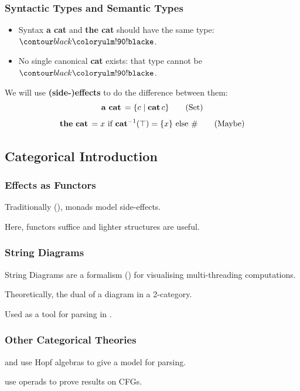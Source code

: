 \documentclass[math, english, info]{beamercours}
\begin{document}
\begin{frame}[fragile]
	\frametitle{Syntactic Types and Semantic Types}
	\begin{itemize}
		\item Syntax \textbf{a cat} and \textbf{the cat} should have the same type: $\e$.
		      \pause
		\item No single canonical \textbf{cat} exists: that type cannot be $\e$.
	\end{itemize}
	\pause

	We will use \textbf{(side-)effects} to do the difference between them:
	\begin{equation*}
		\mathbf{a\ cat}\, = \{c \mid \mathbf{cat}\, c\} \tag{Set}
	\end{equation*}
	\begin{equation*}
		\mathbf{the\ cat}\, = x \text{ if } \mathbf{cat}^{-1}(\top) = \{x\} \text{ else } \# \tag{Maybe}
	\end{equation*}
\end{frame}

\subsection{Categorical Introduction}
\begin{frame}
	\frametitle{Effects as Functors}
	Traditionally (\cite{moggiComputationalLambdacalculusMonads1989}), monads model side-effects.
	\pause

	Here, functors suffice and lighter structures are useful.
\end{frame}

\begin{frame}
	\frametitle{String Diagrams}
	String Diagrams are a formalism (\cite{hinzeIntroducingStringDiagrams2023})
	for visualising multi-threading computations.

	\medskip

	Theoretically, the dual of a diagram in a 2-category.

	\pause
	\medskip
	Used as a tool for parsing in \cite{coeckeMathematicalFoundationsCompositional2010}.
\end{frame}

\begin{frame}
	\frametitle{Other Categorical Theories}
	\cite{marcollimatildeetchomskynoametberwickrobertc.MathematicalStructureSyntactic}
	and \cite{senturiaAlgebraicStructureMorphosyntax2025} use Hopf algebras to
	give a model for parsing.

	\medskip

	\cite{melliesCategoricalContoursChomskySchutzenberger2025} use operads to
	prove results on CFGs.
\end{frame}
\end{document}
